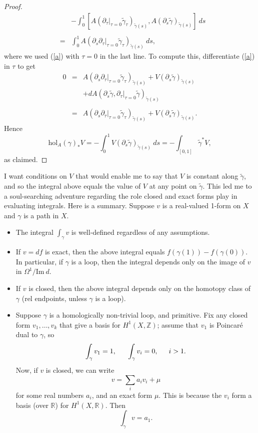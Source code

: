 \documentclass{article}
\newcommand{\sumd}[1]{\displaystyle \sum_{#1}}
\newcommand{\intd}[1]{\displaystyle \int_{#1}}
\newcommand{\intdd}[2]{\displaystyle \int_{#1}^{#2}}
\newcommand{\bb}[1]{\mathbb{#1}}
\newcommand{\hol}{{\mathrm{hol}}}
\begin{document}
\begin{proof}
$$\begin{array}{rcl}
&& - \intdd{0}{1} \left[ A(\partial_\tau \vert_{\tau = 0} \widetilde{\gamma}_\tau )_{\widetilde{\gamma}(s)} , A(\partial_s \widetilde{\gamma} )_{\widetilde{\gamma}(s)} \right] \: ds\\
&&\\
& =&  \intdd{0}{1} A\left( \partial_s  \partial_\tau \vert_{\tau = 0} \widetilde{\gamma}_\tau \right)_{\widetilde{\gamma}(s)} \: ds,
\end{array}$$
where we used (\ref{a}) with $\tau = 0$ in the last line. To compute this, differentiate (\ref{a}) in $\tau$ to get
$$\begin{array}{rcl}
0 & =& A \left( \partial_s \partial_\tau \vert_{\tau = 0} \widetilde{\gamma}_\tau \right)_{\widetilde{\gamma}(s)} + V\left( \partial_s \widetilde{\gamma} \right)_{\widetilde{\gamma}(s)}\\
&& + d A(\partial_s \widetilde{\gamma}, \partial_\tau \vert_{\tau = 0} \widetilde{\gamma} )_{\widetilde{\gamma}(s)}\\
&&\\
& =& A \left( \partial_s \partial_\tau \vert_{\tau = 0} \widetilde{\gamma}_\tau \right)_{\widetilde{\gamma}(s)} + V\left( \partial_s \widetilde{\gamma} \right)_{\widetilde{\gamma}(s)}.
\end{array}$$
Hence
$$\hol_A(\gamma)_*V =  - \intdd{0}{1} V\left( \partial_s \widetilde{\gamma} \right)_{\widetilde{\gamma}(s)} \: ds = - \intd{\left[0, 1\right]} \widetilde{\gamma}^* V,$$
as claimed.
\end{proof}

I want conditions on $V$ that would enable me to say that $V$ is constant along $\widetilde{\gamma}$, and so the integral above equals the value of $V$ at any point on $\widetilde{\gamma}$. This led me to a soul-searching adventure regarding the role closed and exact forms play in evaluating integrals. Here is a summary. Suppose $v$ is a real-valued 1-form on $X$ and $\gamma$ is a path in $X$.

\begin{itemize}
\item The integral $\intd{\gamma} v$ is well-defined regardless of any assumptions. 
\item If $v = df$ is exact, then the above integral equals $f(\gamma(1)) - f(\gamma(0))$. In particular, if $\gamma$ is a loop, then the integral depends only on the image of $v$ in $\Omega^1 / \mathrm{Im} \: d$.
\item If $v$ is closed, then the above integral depends only on the homotopy class of $\gamma$ (rel endpoints, unless $\gamma$ is a loop). 
\item Suppose $\gamma$ is a homologically non-trivial loop, and primitive. Fix any closed form $v_1, \ldots, v_k$ that give a basis for $H^1(X, \bb{Z})$; assume that $v_1$ is Poincar\'{e} dual to $\gamma$, so 
$$\intd{\gamma} v_1 = 1, \indent \intd{\gamma} v_i = 0, \indent i > 1.$$
Now, if $v$ is closed, we can write
$$v = \sumd{i} a_i v_i  + \mu$$
for some real numbers $a_i$, and an exact form $\mu$. This is because the $v_i$ form a basis (over $\bb{R}$) for $H^1(X, \bb{R})$. Then
$$\intd{\gamma} v = a_1.$$
\end{itemize}
\end{document}
